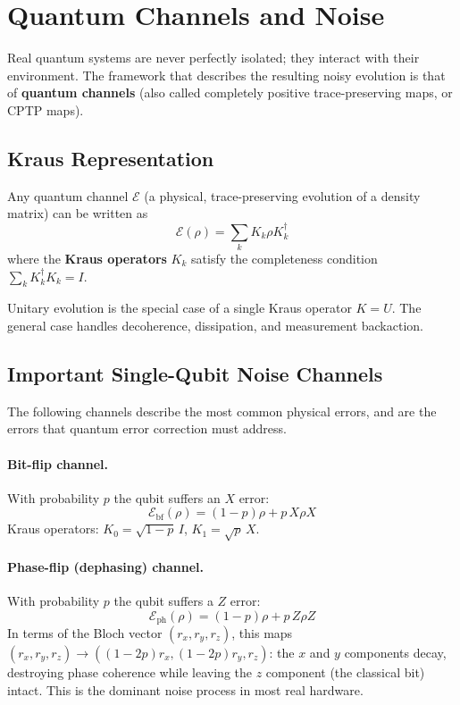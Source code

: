 \documentclass[oneside]{academica}
\begin{document}
\section{Quantum Channels and Noise}

Real quantum systems are never perfectly isolated; they interact with their environment.
The framework that describes the resulting noisy evolution is that of \textbf{quantum channels} (also called completely positive trace-preserving maps, or CPTP maps).

\subsection{Kraus Representation}

\begin{theorem*}
  Any quantum channel $\mathcal{E}$ (a physical, trace-preserving
  evolution of a density matrix) can be written as
  \begin{equation*}
    \mathcal{E}(\rho)=\sum_k K_k\rho K_k^\dagger
  \end{equation*}
  where the \textbf{Kraus operators} $K_k$ satisfy the completeness
  condition $\sum_k K_k^\dagger K_k=I$.
\end{theorem*}

Unitary evolution is the special case of a single Kraus operator $K=U$.
The general case handles decoherence, dissipation, and measurement backaction.

\subsection{Important Single-Qubit Noise Channels}

The following channels describe the most common physical errors, and are the errors that quantum error correction must address.

\paragraph{Bit-flip channel.}
With probability $p$ the qubit suffers an $X$ error:
\begin{equation*}
  \mathcal{E}_{\mathrm{bf}}(\rho)=(1-p)\rho+p\,X\rho X
\end{equation*}
Kraus operators: $K_0=\sqrt{1-p}\,I$, $K_1=\sqrt{p}\,X$.

\paragraph{Phase-flip (dephasing) channel.}
With probability $p$ the qubit suffers a $Z$ error:
\begin{equation*}
  \mathcal{E}_{\mathrm{ph}}(\rho)=(1-p)\rho+p\,Z\rho Z
\end{equation*}
In terms of the Bloch vector $(r_x,r_y,r_z)$, this maps $(r_x,r_y,r_z)\to((1-2p)r_x,(1-2p)r_y,r_z)$: the $x$ and $y$ components decay, destroying phase coherence while leaving the $z$ component (the classical bit) intact.
This is the dominant noise process in most real hardware.
\end{document}
